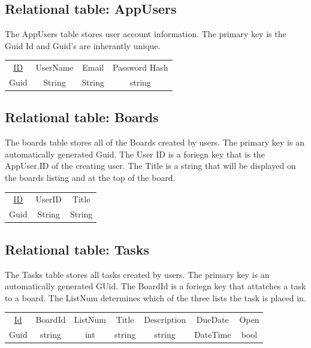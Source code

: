 \documentclass[letterpaper]{article}
\begin{document}
\subsection{Relational table: AppUsers}
The AppUsers table stores user account information. The primary key is the Guid Id and Guid's are inherantly unique.
\begin{center}
\begin{tabular}{|c|c|c|c|}
  \hline
  \underline{ID} & UserName & Email & Password Hash \\
  Guid & String & String & string\\
  \hline
\end{tabular}
\end{center}

\subsection{Relational table: Boards}
The boards table stores all of the Boards created by users. The primary key is an automatically generated Guid. The User ID is a foriegn key that is the AppUser.ID of the creating user. The Title is a string that will be displayed on the boards listing and at the top of the board.
\begin{center}
  \begin{tabular}{|c|c|c|}
    \hline
    \underline{ID} & UserID & Title \\
    Guid & String & String\\
    \hline
  \end{tabular}
  \end{center}
\subsection{Relational table: Tasks}
The Tasks table stores all tasks created by users. The primary key is an automatically generated GUid. The BoardId is a foriegn key that attatches a task to a board. The ListNum determines which of the three lists the task is placed in.
\begin{center}
  \begin{tabular}{|c|c|c|c|c|c|c|}
    \hline
      \underline{Id} & BoardId & ListNum & Title & Description & DueDate & Open \\
      Guid & string & int & string & string & DateTime & bool \\
    \hline
  \end{tabular}
  \end{center}
\end{document}
